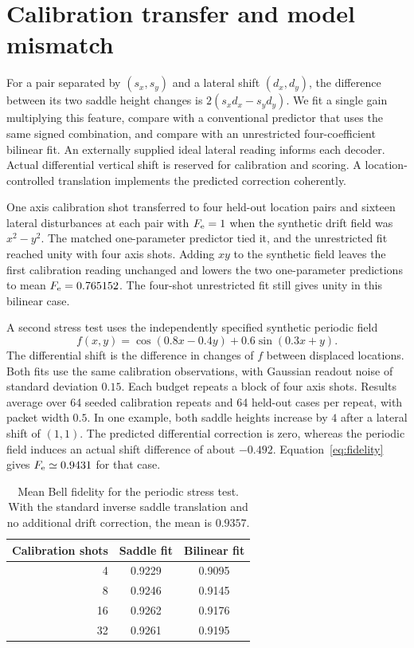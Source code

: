 \documentclass[aip,adv,reprint,floatfix]{revtex4-2}
\begin{document}
\section{Calibration transfer and model mismatch}

For a pair separated by \((s_x,s_y)\) and a lateral shift \((d_x,d_y)\), the difference between its two saddle height changes is \(2(s_xd_x-s_yd_y)\). We fit a single gain multiplying this feature, compare with a conventional predictor that uses the same signed combination, and compare with an unrestricted four-coefficient bilinear fit. An externally supplied ideal lateral reading informs each decoder. Actual differential vertical shift is reserved for calibration and scoring. A location-controlled translation implements the predicted correction coherently.

One axis calibration shot transferred to four held-out location pairs and sixteen lateral disturbances at each pair with \(F_{\rm e}=1\) when the synthetic drift field was \(x^2-y^2\). The matched one-parameter predictor tied it, and the unrestricted fit reached unity with four axis shots. Adding \(xy\) to the synthetic field leaves the first calibration reading unchanged and lowers the two one-parameter predictions to mean \(F_{\rm e}=0.765152\). The four-shot unrestricted fit still gives unity in this bilinear case.

A second stress test uses the independently specified synthetic periodic field
\begin{equation}
f(x,y)=\cos(0.8x-0.4y)+0.6\sin(0.3x+y).
\end{equation}
The differential shift is the difference in changes of \(f\) between displaced locations. Both fits use the same calibration observations, with Gaussian readout noise of standard deviation \(0.15\). Each budget repeats a block of four axis shots. Results average over 64 seeded calibration repeats and 64 held-out cases per repeat, with packet width \(0.5\). In one example, both saddle heights increase by \(4\) after a lateral shift of \((1,1)\). The predicted differential correction is zero, whereas the periodic field induces an actual shift difference of about \(-0.492\). Equation~\eqref{eq:fidelity} gives \(F_{\rm e}\simeq0.9431\) for that case.

\begin{table}[ht]
\caption{Mean Bell fidelity for the periodic stress test. With the standard inverse saddle translation and no additional drift correction, the mean is \(0.9357\).}
\label{tab:drift}
\begin{ruledtabular}
\begin{tabular}{rcc}
Calibration shots & Saddle fit & Bilinear fit\\
\hline
4 & 0.9229 & 0.9095\\
8 & 0.9246 & 0.9145\\
16 & 0.9262 & 0.9176\\
32 & 0.9261 & 0.9195\\
\end{tabular}
\end{ruledtabular}
\end{table}
\end{document}
